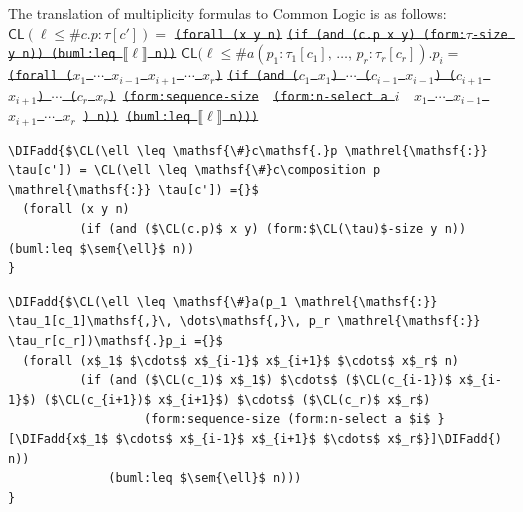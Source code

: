 \documentclass[10pt,fleqn,final]{scrreprt}
\newcommand*{\CL}{\ensuremath{\mathsf{CL}}\xspace}
\newenvironment{definitions}[0]{\medskip }{}
\newcommand{\composition}{\raisebox{0.2pt}{\begin{sideways}\fontsize{6pt}{6pt}\selectfont$\blacklozenge$\end{sideways}}}
\newcommand{\sem}[1]{\mathopen\llbracket#1\mathclose\rrbracket}
\newcommand{\white}[1]{{\color{white}{#1}}}
\newcommand{\qqquad}{\white{x}\qquad}
\providecommand{\DIFadd}[1]{{\protect\color{blue}\uwave{#1}}} %
\providecommand{\DIFdel}[1]{{\protect\color{red}\sout{#1}}}                      %
\providecommand{\DIFaddbegin}{} %
\providecommand{\DIFdelbegin}{} %
\providecommand{\DIFdelend}{} %
\begin{document}
\begin{definitions}
The translation of multiplicity formulas to Common Logic is as follows:
\DIFdelbegin %
\DIFdel{$\CL(\ell \leq \mathsf{\#}c\mathsf{.}p \mathrel{\mathsf{:}} \tau[c']) =$}%
\texttt{\DIFdel{(forall (x y n)}}%
\texttt{\DIFdel{(if (and (c.p x y) (form:$\tau$-size y n)) (buml:leq $\sem{\ell}$ n))}}
\DIFdel{$\CL(\ell \leq \mathsf{\#}a(p_1 \mathrel{\mathsf{:}} \tau_1[c_1]\mathsf{,}\, \dots\mathsf{,}\, p_r \mathrel{\mathsf{:}} \tau_r[c_r])\mathsf{.}p_i=$}%
\texttt{\DIFdel{(forall ($x_1$ $\cdots$ $x_{i-1}$ $x_{i+1}$ $\cdots$ $x_r$)}}%
\texttt{\DIFdel{(if (and ($c_1$ $x_1$) $\cdots$ ($c_{i-1}$ $x_{i-1}$) ($c_{i+1}$ $x_{i+1}$) $\cdots$ ($c_r$ $x_r$)}%
\DIFdel{(form:sequence-size }%
\DIFdel{(form:n-select a $i$ }%
\DIFdel{$x_1$ $\cdots$ $x_{i-1}$ $x_{i+1}$ $\cdots$ $x_r$}%
\DIFdel{) n))}%
\DIFdel{(buml:leq $\sem{\ell}$ n)))}}%
\DIFdelend \DIFaddbegin 

\begin{lstlisting}[language=clif, mathescape]
\DIFadd{$\CL(\ell \leq \mathsf{\#}c\mathsf{.}p \mathrel{\mathsf{:}} \tau[c']) = \CL(\ell \leq \mathsf{\#}c\composition p \mathrel{\mathsf{:}} \tau[c']) ={}$
  (forall (x y n)
          (if (and ($\CL(c.p)$ x y) (form:$\CL(\tau)$-size y n)) (buml:leq $\sem{\ell}$ n))
}\end{lstlisting}

\begin{lstlisting}[language=clif, mathescape]
\DIFadd{$\CL(\ell \leq \mathsf{\#}a(p_1 \mathrel{\mathsf{:}} \tau_1[c_1]\mathsf{,}\, \dots\mathsf{,}\, p_r \mathrel{\mathsf{:}} \tau_r[c_r])\mathsf{.}p_i ={}$
  (forall (x$_1$ $\cdots$ x$_{i-1}$ x$_{i+1}$ $\cdots$ x$_r$ n)
          (if (and ($\CL(c_1)$ x$_1$) $\cdots$ ($\CL(c_{i-1})$ x$_{i-1}$) ($\CL(c_{i+1})$ x$_{i+1}$) $\cdots$ ($\CL(c_r)$ x$_r$)
                   (form:sequence-size (form:n-select a $i$ }[\DIFadd{x$_1$ $\cdots$ x$_{i-1}$ x$_{i+1}$ $\cdots$ x$_r$}]\DIFadd{) n))
              (buml:leq $\sem{\ell}$ n)))
}\end{lstlisting}


\end{definitions}
\end{document}
